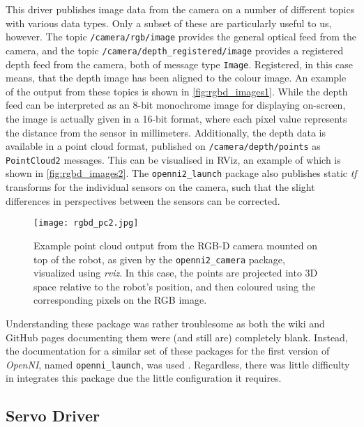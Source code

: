 This driver publishes image data from the camera on a number of different topics with various data types. Only a subset of these are particularly useful to us, however. The topic \texttt{/camera/rgb/image} provides the general optical feed from the camera, and the topic \texttt{/camera/depth\_registered/image} provides a registered depth feed from the camera, both of message type \texttt{Image}. Registered, in this case means, that the depth image has been aligned to the colour image. An example of the output from these topics is shown in \autoref{fig:rgbd_images1}. While the depth feed can be interpreted as an 8-bit monochrome image for displaying on-screen, the image is actually given in a 16-bit format, where each pixel value represents the distance from the sensor in millimeters. Additionally, the depth data is available in a point cloud format, published on \texttt{/camera/depth/points} as \texttt{PointCloud2} messages. This can be visualised in RViz, an example of which is shown in \autoref{fig:rgbd_images2}. The \texttt{openni2\_launch} package also publishes static \emph{tf} transforms for the individual sensors on the camera, such that the slight differences in perspectives between the sensors can be corrected.

\begin{figure}[!h]
    \centering
    \texttt{[image: rgbd\_pc2.jpg]}
    \caption{Example point cloud output from the RGB-D camera mounted on top of the robot, as given by the \texttt{openni2\_camera} package, visualized using \emph{rviz}. In this case, the points are projected into 3D space relative to the robot's position, and then coloured using the corresponding pixels on the RGB image.}
    \label{fig:rgbd_images2}
\end{figure}

Understanding these package was rather troublesome as both the wiki and GitHub pages documenting them were (and still are) completely blank. Instead, the documentation for a similar set of these packages for the first version of \emph{OpenNI}, named \texttt{openni\_launch}, was used \cite{ros_wiki_openni_launch}. Regardless, there was little difficulty in integrates this package due the little configuration it requires.

\subsection{Servo Driver}

